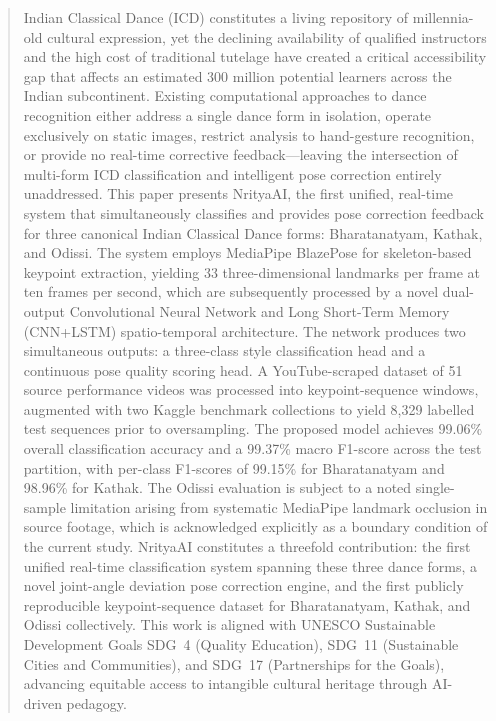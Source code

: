 \documentclass[journal]{IEEEtran}
\begin{document}
\begin{abstract}
Indian Classical Dance (ICD) constitutes a living repository of
millennia-old cultural expression, yet the declining availability of
qualified instructors and the high cost of traditional tutelage have
created a critical accessibility gap that affects an estimated
300 million potential learners across the Indian subcontinent.
Existing computational approaches to dance recognition either address
a single dance form in isolation, operate exclusively on static images,
restrict analysis to hand-gesture recognition, or provide no real-time
corrective feedback—leaving the intersection of multi-form ICD
classification and intelligent pose correction entirely unaddressed.
This paper presents NrityaAI, the first unified, real-time system that
simultaneously classifies and provides pose correction feedback for
three canonical Indian Classical Dance forms: Bharatanatyam, Kathak,
and Odissi. The system employs MediaPipe BlazePose for
skeleton-based keypoint extraction, yielding 33 three-dimensional
landmarks per frame at ten frames per second, which are subsequently
processed by a novel dual-output Convolutional Neural Network and Long
Short-Term Memory (CNN+LSTM) spatio-temporal architecture. The network
produces two simultaneous outputs: a three-class style classification
head and a continuous pose quality scoring head. A YouTube-scraped
dataset of 51 source performance videos was processed into
keypoint-sequence windows, augmented with two Kaggle benchmark
collections to yield 8,329 labelled test sequences prior to
oversampling. The proposed model achieves 99.06\% overall classification
accuracy and a 99.37\% macro F1-score across the test partition,
with per-class F1-scores of 99.15\% for Bharatanatyam and 98.96\%
for Kathak. The Odissi evaluation is subject to a noted single-sample
limitation arising from systematic MediaPipe landmark occlusion in
source footage, which is acknowledged explicitly as a boundary condition
of the current study. NrityaAI constitutes a threefold contribution:
the first unified real-time classification system spanning these three
dance forms, a novel joint-angle deviation pose correction engine, and
the first publicly reproducible keypoint-sequence dataset for
Bharatanatyam, Kathak, and Odissi collectively. This work is aligned
with UNESCO Sustainable Development Goals SDG~4 (Quality Education),
SDG~11 (Sustainable Cities and Communities), and SDG~17 (Partnerships
for the Goals), advancing equitable access to intangible cultural
heritage through AI-driven pedagogy.
\end{abstract}
\end{document}
